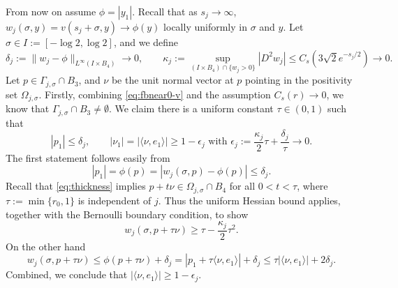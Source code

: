 \documentclass[11pt]{article}
\numberwithin{equation}{section}
\theoremstyle{definition}
\begin{document}
From now on assume $\phi=|y_1|$. 
Recall that as $s_j\to\infty$,  $w_j(\sigma , y) = v \left( s_j + \sigma , y \right) \to \phi (y)$ locally uniformly in $\sigma$ and $y$. 
Let $\sigma \in I :=[-\log 2, \log 2]$, and we define
\[ \delta_j:= \|w_j - \phi\|_{L^\infty(I\times B_4 )} \to 0, \qquad \kappa_j:= \sup_{\left( I\times B_4 \right) \cap \{w_j>0\}} |D^2 w_j| \leq C_s(3\sqrt{2} e^{-s_j/2}) \to 0. \]
Let $p\in \Gamma_{j,\sigma} \cap B_3$, and $\nu$ be the unit normal vector at $p$ pointing in the positivity set $\Omega_{j,\sigma}$. Firstly, combining \eqref{eq:fbnear0-v} and the assumption $C_s(r) \to 0$, we know that $\Gamma_{j,\sigma} \cap B_3 \neq \emptyset$. We claim there is a uniform constant $\tau \in (0,1)$ such that 
\begin{equation}\label{eq:twophase-cv}
    |p_1| \leq \delta_j, \qquad |\nu_1| = |\langle \nu, e_1 \rangle| \geq 1- \epsilon_j  \text{ with } \epsilon_j:= \frac{\kappa_j}{2} \tau + \frac{\delta_j}{\tau} \to 0.
\end{equation}
The first statement follows easily from
\[ |p_1|=\phi(p) = |w_j(\sigma, p) - \phi(p)| \leq \delta_j. \]
Recall that \eqref{eq:thickness} implies $p + t \nu \in \Omega_{j,\sigma} \cap B_4$ for all $0<t<\tau$, where $\tau:= \min\{r_0, 1\}$ is independent of $j$. Thus the uniform Hessian bound applies, together with the Bernoulli boundary condition, to show
\[ w_j(\sigma, p+\tau\nu) \geq \tau - \frac{\kappa_j}{2} \tau^2. \]
On the other hand
\[ w_j(\sigma, p+\tau\nu) \leq \phi(p+\tau\nu) + \delta_j = |p_1 + \tau \langle \nu, e_1 \rangle | + \delta_j \leq \tau |\langle \nu, e_1 \rangle | + 2\delta_j. \]
Combined, we conclude that $|\langle \nu, e_1 \rangle| \geq 1- \epsilon_j$.
\end{document}
